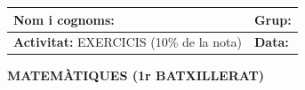 \documentclass[12pt,a4paper]{article}
\begin{document}
\begingroup
\renewcommand{\arraystretch}{2.2}
\begin{tabularx}{\textwidth}{|X|p{4cm}|}
    \hline
    \textbf{Nom i cognoms:} & \textbf{Grup:} \\ \hline
    \textbf{Activitat:} EXERCICIS (10\% de la nota) & \textbf{Data:} \\ \hline
\end{tabularx}
\endgroup

\vspace{0.8cm}

\begin{center}
    {\Large \textbf{MATEMÀTIQUES (1r BATXILLERAT)}}
\end{center}

\vspace{0.5cm}

\end{document}
